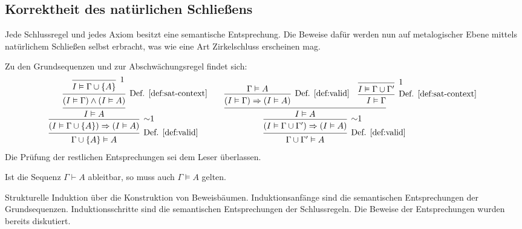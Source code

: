 \subsection{Korrektheit des natürlichen Schließens}

Jede Schlussregel und jedes Axiom besitzt eine semantische Entsprechung.
Die Beweise dafür werden nun auf metalogischer Ebene mittels natürlichem
Schließen selbst erbracht, was wie eine Art Zirkelschluss erscheinen
mag.

Zu den Grundsequenzen und zur Abschwächungsregel findet sich:
\[
\begin{array}{@{}l@{\qquad}l}
\begin{prooftree}[center = false, separation = 1em]
        \infer0[1]{I\models\Gamma\cup\{A\}}
      \infer1[Def. \ref{def:sat-context}]{(I\models\Gamma)\land (I\models A)}
    \infer1{I\models A}
  \infer1[$\sim$1]{(I\models \Gamma\cup\{A\})\cond (I\models A)}
\infer1[Def. \ref{def:valid}]{\Gamma\cup\{A\}\models A}
\end{prooftree}
&
\begin{prooftree}[center = false, separation = 1em]
        \hypo{\Gamma\models A}
      \infer1[Def. \ref{def:valid}]{(I\models\Gamma)\cond (I\models A)}
        \infer0[1]{I\models\Gamma\cup\Gamma'}
      \infer1[Def. \ref{def:sat-context}]{I\models\Gamma}
    \infer2{I\models A}
  \infer1[$\sim$1]{(I\models\Gamma\cup\Gamma')\cond (I\models A)}
\infer1[Def. \ref{def:valid}]{\Gamma\cup\Gamma'\models A}
\end{prooftree}
\end{array}
\]
Die Prüfung der restlichen Entsprechungen sei dem Leser überlassen.

\begin{Satz}\newlinefirst
Ist die Sequenz $\Gamma\vdash A$ ableitbar, so muss auch
$\Gamma\models A$ gelten.
\end{Satz}
\begin{Beweis}
Strukturelle Induktion über die Konstruktion von Beweisbäumen.
Induktionsanfänge sind die semantischen Entsprechungen
der Grundsequenzen. Induktionsschritte sind die semantischen
Entsprechungen der Schlussregeln. Die Beweise der Entsprechungen
wurden bereits diskutiert.\,\qedsymbol
\end{Beweis}


